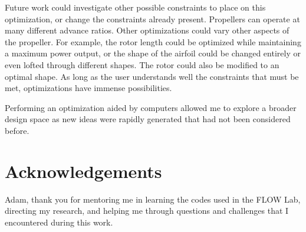 \documentclass[journal ]{new-aiaa}
\begin{document}
Future work could investigate other possible constraints to place on this optimization, or change the constraints already present. Propellers can operate at many different advance ratios. Other optimizations could vary other aspects of the propeller. For example, the rotor length could be optimized while maintaining a maximum power output, or the shape of the airfoil could be changed entirely or even lofted through different shapes. The rotor could also be modified to an optimal shape. As long as the user understands well the constraints that must be met, optimizations have immense possibilities.

Performing an optimization aided by computers allowed me to explore a broader design space as new ideas were rapidly generated that had not been considered before.


\section{Acknowledgements}

Adam, thank you for mentoring me in learning the codes used in the FLOW Lab, directing my research, and helping me through questions and challenges that I encountered during this work.




\end{document}
